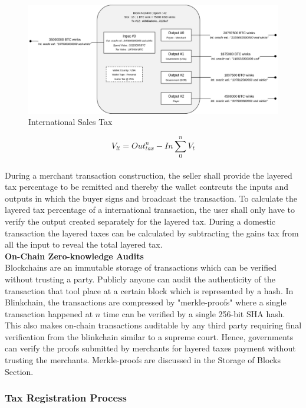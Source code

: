 \documentclass[letterpaper,11pt]{article}
\begin{document}
\begin{figure}
\begin{center}
\includegraphics[width=\textwidth]{layeredtaxint}
\caption{International Sales Tax}
\end{center}
\end{figure}

\[V_{lt} = Out_{tax}^n - In\sum_{0}^{n} V_t \]\\


During a merchant transaction construction, the seller shall provide the layered tax percentage to be remitted and thereby the wallet contrcuts the inputs and outputs in which the buyer signs and broadcast the transaction. To calculate the layered tax percentage of a international transaction, the user shall only have to verify the output created separately for the layered tax. During a domestic transaction the layered taxes can be calculated by subtracting the gains tax from all the input to reveal the total layered tax.\\


\textbf{On-Chain Zero-knowledge Audits}\\

Blockchains are an immutable storage of transactions which can be verified without trusting a party. Publicly anyone can audit the authenticity of the transaction that tool place at a certain block which is represented by a hash. In Blinkchain, the transactions are compressed by "merkle-proofs" where a single transaction happened at $n$ time can be verified by a single 256-bit SHA hash. This also makes on-chain transactions auditable by any third party requiring final verification from the blinkchain similar to a supreme court. Hence, governments can verify the proofs submitted by merchants for layered taxes payment without trusting the merchants. Merkle-proofs are discussed in the Storage of Blocks Section.

\subsubsection{Tax Registration Process}
\end{document}
